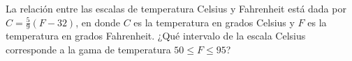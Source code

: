 \item La relación entre las escalas de temperatura Celsius y Fahrenheit está dada por $C = \frac{5}{9}(F - 32)$, en donde $C$ es la temperatura en grados Celsius y $F$ es la temperatura en grados Fahrenheit. ¿Qué intervalo de la escala Celsius corresponde a la gama de temperatura $50 \le F \le 95$?
